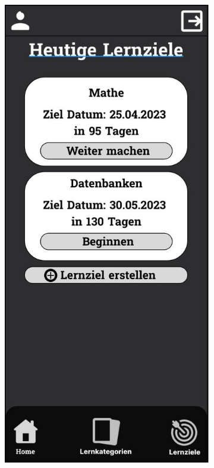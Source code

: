 \newpage

\begin{figure}[htbp]
  \centering
  \begin{subfigure}[b]{0.45\linewidth}
    \centering
    \includegraphics[width=\linewidth]{images/Mockups/Home.JPG}

\end{subfigure}
\end{figure}
